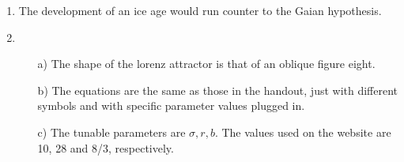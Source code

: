 \documentclass[11pt,oneside]{article}
\begin{document}
\begin{enumerate}
\item The development of an ice age would run counter to the Gaian hypothesis. 

\item
\begin{enumerate}
\item[a)] The shape of the lorenz attractor is that of an oblique figure eight. 
\item[b)] The equations are the same as those in the handout, just with different symbols and with specific parameter values plugged in. 
\item[c)] The tunable parameters are $\sigma,r,b$.  The values used on the website are 10, 28 and 8/3, respectively. 

\end{enumerate}


\end{enumerate}
\end{document}
